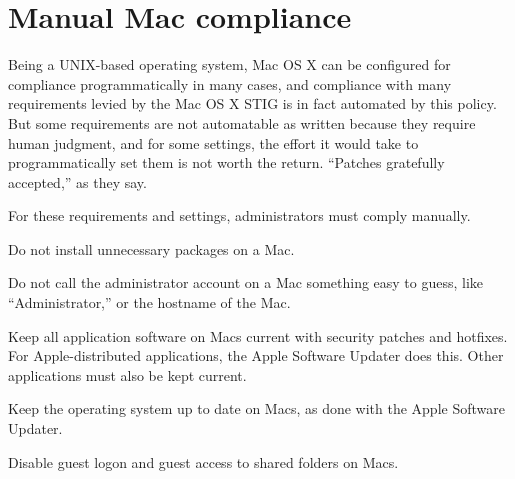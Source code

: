 %
%
%
\section{Manual Mac compliance}
\label{ManualMac}

Being a UNIX-based operating system, Mac OS X can be configured for
compliance programmatically in many cases, and compliance with many
requirements levied by the Mac OS X STIG is in fact automated by this
policy. But some requirements are not automatable as written because they
require human judgment, and for some settings, the effort it would take to
programmatically set them is not worth the return. ``Patches gratefully
accepted,'' as they say.

For these requirements and settings, administrators must comply manually.

\dinkus

%
%
Do not install unnecessary packages on a Mac.

%
Do not call the administrator account on a Mac something easy to guess,
like ``Administrator,'' or the hostname of the Mac.

%
Keep all application software on Macs current with security patches and
hotfixes. For Apple-distributed applications, the Apple Software Updater
does this. Other applications must also be kept current.

%
%
Keep the operating system up to date on Macs, as done with the Apple
Software Updater.

%
Disable guest logon and guest access to shared folders on Macs.

